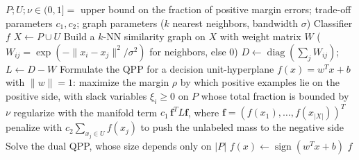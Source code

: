 \documentclass{article}
\begin{document}
\begin{algorithm}[!h]
\renewcommand{\algorithmicrequire}{\textbf{Input:}} %
\renewcommand{\algorithmicensure}{\textbf{Output:}} %
	\caption{LUHC (Laplacian Unit-Hyperplane Classifier)} %
	\begin{algorithmic}[1] %
	    \REQUIRE
	    $P;U;\nu\in(0,1]=$ upper bound on the fraction of positive margin errors; trade-off parameters $c_1,c_2$; graph parameters ($k$ nearest neighbors, bandwidth $\sigma$)
	    \ENSURE
	    Classifier $f$
	    \STATE $X\leftarrow P\cup U$
	    \STATE Build a $k$-NN similarity graph on $X$ with weight matrix $W$ ($W_{ij}=\exp(-\|x_i-x_j\|^2/\sigma^2)$ for neighbors, else 0)
	    \STATE $D\leftarrow \operatorname{diag}(\textstyle\sum_j W_{ij})$;\ $L\leftarrow D-W$ %
	    \STATE Formulate the QPP for a decision unit-hyperplane $f(x)=w^{T}x+b$ with $\|w\|=1$: %
	    \STATE \quad maximize the margin $\rho$ by which positive examples lie on the positive side, with slack variables $\xi_i\geq 0$ on $P$ whose total fraction is bounded by $\nu$
	    \STATE \quad regularize with the manifold term $c_1\, \boldsymbol{f}^{T}L\boldsymbol{f}$, where $\boldsymbol{f}=(f(x_1),\dots,f(x_{|X|}))^{T}$ %
	    \STATE \quad penalize with $c_2\sum_{x_j\in U} f(x_j)$ to push the unlabeled mass to the negative side %
	    \STATE Solve the dual QPP, whose size depends only on $|P|$ %
	    \STATE $f(x)\leftarrow \operatorname{sign}(w^{T}x+b)$
		\RETURN $f$
	\end{algorithmic}
\end{algorithm}
\end{document}
